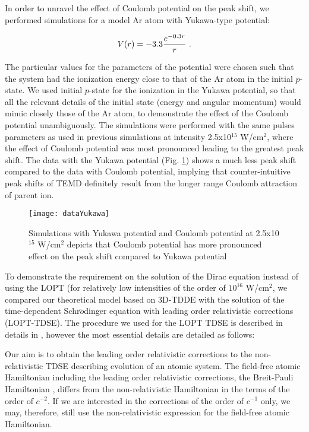 \documentclass[aps,prl,twocolumn,superscriptaddress,amsmath,amssymb]{revtex4-1}
\begin{document}
In order to unravel the effect of Coulomb potential on the peak shift, we performed simulations for a model Ar atom with Yukawa-type potential:

\begin{equation}
V(r)= -3.3 {e^{-0.3r}\over r} \ .
\label{yukawa}
\end{equation}

The particular values for the parameters of the potential were chosen such that the system had the ionization energy close to that of the Ar atom in the initial $p$-state.  We used initial $p$-state for the ionization in the Yukawa potential, so that all the relevant details of the initial state (energy and angular momentum) would mimic closely those of the Ar atom, to demonstrate the effect of the Coulomb potential unambiguously. The simulations were performed with the same pulses parameters as used in previous simulations at intensity 2.5x10$^{15}$ W/cm$^{2}$, where the effect of Coulomb potential was most pronounced leading to the greatest peak shift. The data with the Yukawa potential (Fig. \ref {fig:dataYukawa}) shows a much less peak shift compared to the data with Coulomb potential, implying that counter-intuitive peak shifts of TEMD  definitely result from the longer range Coulomb attraction of parent ion.

\begin{figure}[!ht]
\texttt{[image: dataYukawa]}
\caption{\label{fig:dataYukawa}} Simulations with Yukawa potential and Coulomb potential at 2.5x10$^{15}$ W/cm$^{2}$ depicts that Coulomb potential has more pronounced effect on the peak shift compared to Yukawa potential
\end{figure}

To demonstrate the requirement on the solution of the Dirac equation instead of using the LOPT (for relatively low intensities of the order of $10^{16}$ W/cm$^2$, we compared our theoretical model based on 3D-TDDE with the solution of the time-dependent Schr$\ddot o$dinger equation with leading order relativistic corrections (LOPT-TDSE). The procedure we used for the LOPT TDSE is described in details in \cite{Ivanov2016a}, however the most essential details are detailed as follows:

Our aim is to obtain the leading order relativistic corrections to the non-relativistic TDSE describing evolution of an atomic system. The field-free atomic Hamiltonian including the leading order relativistic corrections, the Breit-Pauli Hamiltonian \cite{Sobelman72}, differs from the non-relativistic Hamiltonian in the terms of the order of $c^{-2}$. If we are interested in the corrections of the order of $c^{-1}$ only, we may, therefore, still use the non-relativistic expression for the field-free atomic Hamiltonian.
\end{document}
